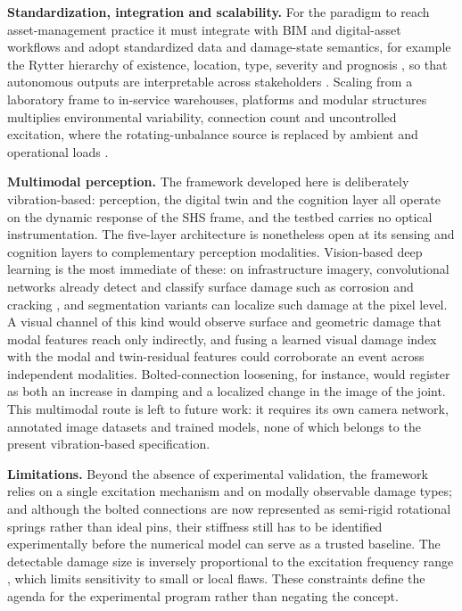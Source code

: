 \textbf{Standardization, integration and scalability.} For the paradigm to reach asset-management practice it must integrate with BIM and digital-asset workflows and adopt standardized data and damage-state semantics, for example the Rytter hierarchy of existence, location, type, severity and prognosis \citep{farrar2013shm}, so that autonomous outputs are interpretable across stakeholders \citep{chiachio2022structural,mariniello2025enhancing}. Scaling from a laboratory frame to in-service warehouses, platforms and modular structures multiplies environmental variability, connection count and uncontrolled excitation, where the rotating-unbalance source is replaced by ambient and operational loads \citep{he2022integrated}.

\textbf{Multimodal perception.} The framework developed here is deliberately vibration-based: perception, the digital twin and the cognition layer all operate on the dynamic response of the SHS frame, and the testbed carries no optical instrumentation. The five-layer architecture is nonetheless open at its sensing and cognition layers to complementary perception modalities. Vision-based deep learning is the most immediate of these: on infrastructure imagery, convolutional networks already detect and classify surface damage such as corrosion and cracking \citep{karaaslan2021attention,arya2021roaddamage}, and segmentation variants can localize such damage at the pixel level. A visual channel of this kind would observe surface and geometric damage that modal features reach only indirectly, and fusing a learned visual damage index with the modal and twin-residual features could corroborate an event across independent modalities. Bolted-connection loosening, for instance, would register as both an increase in damping and a localized change in the image of the joint. This multimodal route is left to future work: it requires its own camera network, annotated image datasets and trained models, none of which belongs to the present vibration-based specification.

\textbf{Limitations.} Beyond the absence of experimental validation, the framework relies on a single excitation mechanism and on modally observable damage types; and although the bolted connections are now represented as semi-rigid rotational springs rather than ideal pins, their stiffness still has to be identified experimentally before the numerical model can serve as a trusted baseline. The detectable damage size is inversely proportional to the excitation frequency range \citep{farrar2013shm}, which limits sensitivity to small or local flaws. These constraints define the agenda for the experimental program rather than negating the concept.
